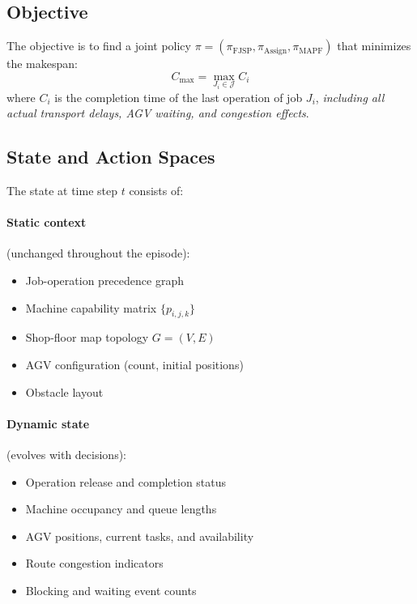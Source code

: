 \documentclass[11pt,a4paper]{article}
\begin{document}
\subsection{Objective}

The objective is to find a joint policy $\pi = (\pi_{\text{FJSP}}, \pi_{\text{Assign}}, \pi_{\text{MAPF}})$ that minimizes the makespan:
\begin{equation}
    C_{\max} = \max_{J_i \in \mathcal{J}} C_i
\end{equation}
where $C_i$ is the completion time of the last operation of job $J_i$, \emph{including all actual transport delays, AGV waiting, and congestion effects}.

\subsection{State and Action Spaces}

The state at time step $t$ consists of:

\paragraph{Static context} (unchanged throughout the episode):
\begin{itemize}[leftmargin=*]
    \item Job-operation precedence graph
    \item Machine capability matrix $\{p_{i,j,k}\}$
    \item Shop-floor map topology $G = (V, E)$
    \item AGV configuration (count, initial positions)
    \item Obstacle layout
\end{itemize}

\paragraph{Dynamic state} (evolves with decisions):
\begin{itemize}[leftmargin=*]
    \item Operation release and completion status
    \item Machine occupancy and queue lengths
    \item AGV positions, current tasks, and availability
    \item Route congestion indicators
    \item Blocking and waiting event counts
\end{itemize}
\end{document}

